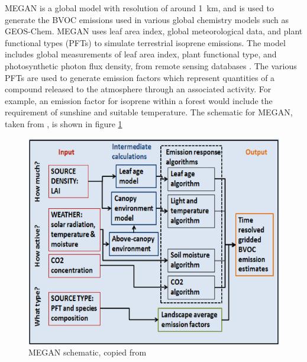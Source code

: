     MEGAN is a global model with resolution of around 1~km, and is used to generate the BVOC emissions used in various global chemistry models such as GEOS-Chem.
    MEGAN uses leaf area index, global meteorological data, and plant functional types (PFTs) to simulate terrestrial isoprene emissions.
    The model includes global measurements of leaf area index, plant functional type, and photosynthetic photon flux density, from remote sensing databases \parencite{Kefauver2014}.
    The various PFTs are used to generate emission factors which represent quantities of a compound released to the atmosphere through an associated activity.
    For example, an emission factor for isoprene within a forest would include the requirement of sunshine and suitable temperature.
    The schematic for MEGAN, taken from \textcite{Megan_Website}, is shown in figure \ref{Models:GC:Isop:MEGAN:fig_megan_schematic}
    
    \begin{figure}[!htbp]
      \includegraphics[width=\textwidth]{Figures/MEGANmodel_img.jpg}
      \caption{MEGAN schematic, copied from \textcite{Megan_Website}}
      \label{Models:GC:Isop:MEGAN:fig_megan_schematic}
    \end{figure}
    

